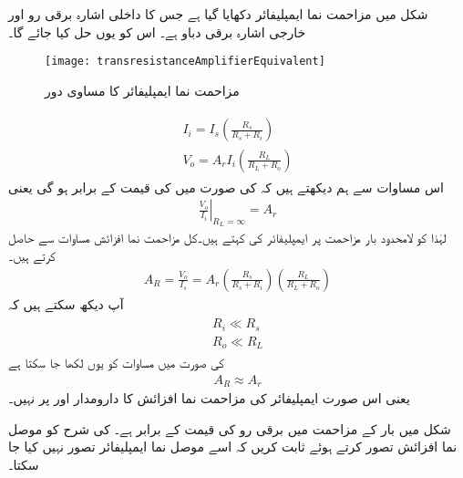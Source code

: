 شکل  میں مزاحمت نما ایمپلیفائر دکھایا گیا ہے جس کا داخلی اشارہ برقی رو  اور خارجی اشارہ برقی دباو  ہے۔ اس کو یوں حل کیا جائے گا۔
\begin{figure}
\centering
\texttt{[image: transresistanceAmplifierEquivalent]}
\caption{مزاحمت نما ایمپلیفائر کا مساوی دور}
\label{شکل_واپسی_مزاحمت_نما_ایمپلیفائر_کا_مساوی_دور}
\end{figure}
%
\begin{gather} \label{مساوات_واپسی_مزاحمت_نما_ایمپلیفائر_کے_مساوات}
\begin{aligned}
I_i=I_s \left(\frac{R_s}{R_s+R_i}\right) \\
V_o=A_r I_i \left(\frac{R_L}{R_L+R_o}\right)
\end{aligned}
\end{gather}
اس مساوات سے ہم دیکھتے ہیں کہ  کی صورت میں  کی قیمت  کے برابر ہو گی یعنی
\begin{align}
\left . \frac{V_o}{I_i} \right |_{R_L = \infty}=A_r
\end{align}
لہٰذا  کو لامحدود بار مزاحمت پر ایمپلیفائر کی   کہتے ہیں۔کل مزاحمت نما افزائش  مساوات  سے حاصل کرتے ہیں۔
\begin{align} \label{مساوات_واپسی_کل_مزاحمت_نما}
A_R=\frac{V_o}{I_s}=A_r \left( \frac{R_s}{R_s+R_i} \right ) \left ( \frac{R_L}{R_L +R_o} \right )
\end{align}
آپ دیکھ سکتے ہیں کہ 
\begin{gather}
\begin{aligned} \label{مساوات_واپسی_حقیقی_مزاحمت_نما_ایمپلیفائر_کے_مزاحمت}
R_i \ll R_s \\
R_o \ll R_L
\end{aligned}
\end{gather}
 کی صورت میں مساوات  کو یوں لکھا جا سکتا ہے
\begin{align} \label{مساوات_واپسی_کل_مزاحمت_نما_تقریبا_اٹل_ہے}
A_R \approx A_r
\end{align}
یعنی اس صورت ایمپلیفائر کی مزاحمت نما افزائش کا دارومدار  اور  پر نہیں۔

 
شکل  میں بار کے مزاحمت  میں برقی رو کی قیمت   کے برابر  ہے۔   کی شرح کو موصل نما افزائش تصور کرتے ہوئے ثابت کریں کہ اسے موصل نما ایمپلیفائر تصور نہیں کیا جا سکتا۔

